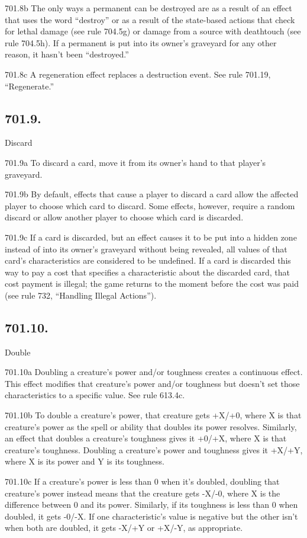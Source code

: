 701.8b The only ways a permanent can be destroyed are as a result of an effect that uses the word “destroy” or as a result of the state-based actions that check for lethal damage (see rule 704.5g) or damage from a source with deathtouch (see rule 704.5h). If a permanent is put into its owner’s graveyard for any other reason, it hasn’t been “destroyed.”

701.8c A regeneration effect replaces a destruction event. See rule 701.19, “Regenerate.”

\subsection*{701.9.}
Discard

701.9a To discard a card, move it from its owner’s hand to that player’s graveyard.

701.9b By default, effects that cause a player to discard a card allow the affected player to choose which card to discard. Some effects, however, require a random discard or allow another player to choose which card is discarded.

701.9c If a card is discarded, but an effect causes it to be put into a hidden zone instead of into its owner’s graveyard without being revealed, all values of that card’s characteristics are considered to be undefined. If a card is discarded this way to pay a cost that specifies a characteristic about the discarded card, that cost payment is illegal; the game returns to the moment before the cost was paid (see rule 732, “Handling Illegal Actions”).

\subsection*{701.10.}
Double

701.10a Doubling a creature’s power and/or toughness creates a continuous effect. This effect modifies that creature’s power and/or toughness but doesn’t set those characteristics to a specific value. See rule 613.4c.

701.10b To double a creature’s power, that creature gets +X/+0, where X is that creature’s power as the spell or ability that doubles its power resolves. Similarly, an effect that doubles a creature’s toughness gives it +0/+X, where X is that creature’s toughness. Doubling a creature’s power and toughness gives it +X/+Y, where X is its power and Y is its toughness.

701.10c If a creature’s power is less than 0 when it’s doubled, doubling that creature’s power instead means that the creature gets -X/-0, where X is the difference between 0 and its power. Similarly, if its toughness is less than 0 when doubled, it gets -0/-X. If one characteristic’s value is negative but the other isn’t when both are doubled, it gets -X/+Y or +X/-Y, as appropriate.

